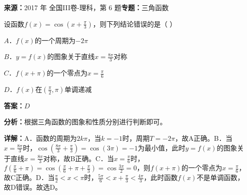 \begin{question}[points=5]
\textbf{来源：}2017 年 全国III卷-理科，第 6 题\quad \textbf{专题：}三角函数\par
设函数$f(x)=\cos(x+\frac{\pi}{3})$，则下列结论错误的是（ ）
\begin{choices}
  \item $A$．$f(x)$的一个周期为$-2\pi$
  \item $B$．$y=f(x)$的图象关于直线$x=\frac{8\pi}{3}$对称
  \item $C$．$f(x+\pi)$的一个零点为$x=\frac{\pi}{6}$
  \item $D$．$f(x)$在$(\frac{\pi}{2},\pi)$单调递减
\end{choices}
\begin{solution}
\textbf{答案：}$D$

\textbf{分析：}根据三角函数的图象和性质分别进行判断即可。

\textbf{详解：}A．函数的周期为$2k\pi$，当$k=-1$时，周期$T=-2\pi$，故A正确。B．当$x=\frac{8\pi}{3}$时，$\cos(\frac{8\pi}{3}+\frac{\pi}{3})=\cos(3\pi)=-1$为最小值，此时$y=f(x)$的图象关于直线$x=\frac{8\pi}{3}$对称，故B正确。C．当$x=\frac{\pi}{6}$时，$f(\frac{\pi}{6}+\pi)=\cos(\frac{\pi}{6}+\pi+\frac{\pi}{3})=\cos\frac{3\pi}{2}=0$，则$f(x+\pi)$的一个零点为$x=\frac{\pi}{6}$，故C正确。D．当$\frac{\pi}{2}<x<\pi$时，$\frac{5\pi}{6}<x+\frac{\pi}{3}<\frac{4\pi}{3}$，此时函数$f(x)$不是单调函数，故D错误。故选D。
\end{solution}
\end{question}

